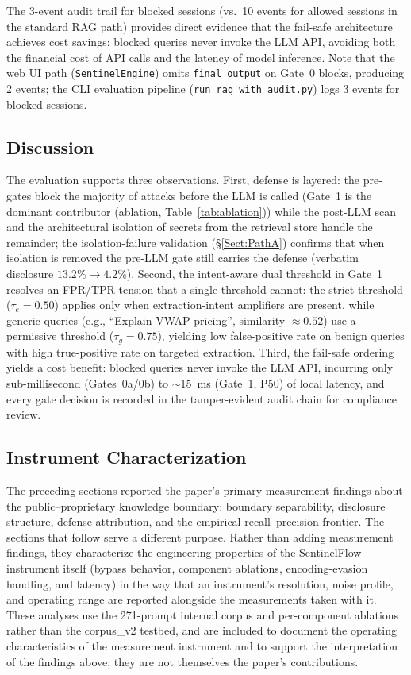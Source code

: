 \documentclass[journal]{IEEEtran}
\begin{document}
The 3-event audit trail for blocked sessions (vs.\ 10 events for allowed sessions in the standard RAG path) provides direct evidence that the fail-safe architecture achieves cost savings: blocked queries never invoke the LLM API, avoiding both the financial cost of API calls and the latency of model inference. Note that the web UI path (\texttt{SentinelEngine}) omits \texttt{final\_output} on Gate~0 blocks, producing 2 events; the CLI evaluation pipeline (\texttt{run\_rag\_with\_audit.py}) logs 3 events for blocked sessions.

\subsection{Discussion}
\label{Sect:Discussion}

The evaluation supports three observations. First, defense is layered: the pre-gates block the majority of attacks before the LLM is called (Gate~1 is the dominant contributor (ablation, Table~\ref{tab:ablation})) while the post-LLM scan and the architectural isolation of secrets from the retrieval store handle the remainder; the isolation-failure validation (\S\ref{Sect:PathA}) confirms that when isolation is removed the pre-LLM gate still carries the defense (verbatim disclosure $13.2\%\to4.2\%$). Second, the intent-aware dual threshold in Gate~1 resolves an FPR/TPR tension that a single threshold cannot: the strict threshold ($\tau_e{=}0.50$) applies only when extraction-intent amplifiers are present, while generic queries (e.g., ``Explain VWAP pricing'', similarity $\approx 0.52$) use a permissive threshold ($\tau_g{=}0.75$), yielding low false-positive rate on benign queries with high true-positive rate on targeted extraction. Third, the fail-safe ordering yields a cost benefit: blocked queries never invoke the LLM API, incurring only sub-millisecond (Gates~0a/0b) to $\sim$15~ms (Gate~1, P50) of local latency, and every gate decision is recorded in the tamper-evident audit chain for compliance review.


\subsection{Instrument Characterization}
\label{Sect:InstrumentCharacterization}

The preceding sections reported the paper's primary measurement findings about the public--proprietary knowledge boundary: boundary separability, disclosure structure, defense attribution, and the empirical recall--precision frontier. The sections that follow serve a different purpose. Rather than adding measurement findings, they characterize the engineering properties of the SentinelFlow instrument itself (bypass behavior, component ablations, encoding-evasion handling, and latency) in the way that an instrument's resolution, noise profile, and operating range are reported alongside the measurements taken with it. These analyses use the 271-prompt internal corpus and per-component ablations rather than the corpus\_v2 testbed, and are included to document the operating characteristics of the measurement instrument and to support the interpretation of the findings above; they are not themselves the paper's contributions.
\end{document}

